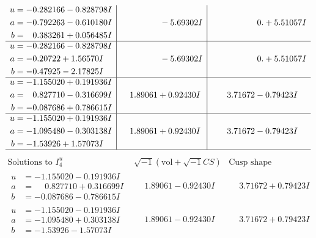 \documentclass[1p]{elsarticle_modified}
\theoremstyle{definition}
\newcommand{\I}{\sqrt{-1}}
\begin{document}
$$\begin{array}{c|c|c}
\begin{aligned}
u &= -0.282166 - 0.828798 I \\
a &= -0.792263 - 0.610180 I \\
b &= \phantom{-}0.383261 + 0.056485 I\end{aligned}
 & \phantom{-0.000000 } -5.69302 I & \phantom{-0.000000 -}0. + 5.51057 I \\ \hline\begin{aligned}
u &= -0.282166 - 0.828798 I \\
a &= -0.20722 + 1.56570 I \\
b &= -0.47925 - 2.17825 I\end{aligned}
 & \phantom{-0.000000 } -5.69302 I & \phantom{-0.000000 -}0. + 5.51057 I \\ \hline\begin{aligned}
u &= -1.155020 + 0.191936 I \\
a &= \phantom{-}0.827710 - 0.316699 I \\
b &= -0.087686 + 0.786615 I\end{aligned}
 & \phantom{-}1.89061 + 0.92430 I & \phantom{-}3.71672 - 0.79423 I \\ \hline\begin{aligned}
u &= -1.155020 + 0.191936 I \\
a &= -1.095480 - 0.303138 I \\
b &= -1.53926 + 1.57073 I\end{aligned}
 & \phantom{-}1.89061 + 0.92430 I & \phantom{-}3.71672 - 0.79423 I\\
 \hline 
 \end{array}$$\newpage$$\begin{array}{c|c|c}  
\text{Solutions to }I^u_{4}& \I (\text{vol} + \sqrt{-1}CS) & \text{Cusp shape}\\
 \hline 
\begin{aligned}
u &= -1.155020 - 0.191936 I \\
a &= \phantom{-}0.827710 + 0.316699 I \\
b &= -0.087686 - 0.786615 I\end{aligned}
 & \phantom{-}1.89061 - 0.92430 I & \phantom{-}3.71672 + 0.79423 I \\ \hline\begin{aligned}
u &= -1.155020 - 0.191936 I \\
a &= -1.095480 + 0.303138 I \\
b &= -1.53926 - 1.57073 I\end{aligned}
 & \phantom{-}1.89061 - 0.92430 I & \phantom{-}3.71672 + 0.79423 I \\ \hline\begin{aligned}

\end{aligned}
\end{array}$$
\end{document}
